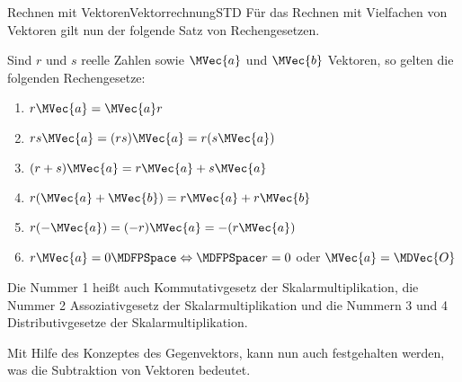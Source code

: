 \begin{MXContent}{Rechnen mit Vektoren}{Vektorrechnung}{STD}
Für das Rechnen mit Vielfachen von Vektoren gilt nun der folgende Satz von Rechengesetzen.

\begin{MInfo}
Sind $r$ und $s$ reelle Zahlen sowie $\MVec{a}$ und $\MVec{b}$ Vektoren, so gelten die folgenden Rechengesetze:
\begin{enumerate}
 \item $r\MVec{a}=\MVec{a}r$
 \item $r s\MVec{a}=(r s)\MVec{a}=r(s\MVec{a})$
 \item $(r+s)\MVec{a}=r\MVec{a}+s\MVec{a}$
 \item $r(\MVec{a}+\MVec{b})=r\MVec{a}+r\MVec{b}$
 \item $r(-\MVec{a})=(-r)\MVec{a}=-(r\MVec{a})$
 \item $r\MVec{a}=0\MDFPSpace\Leftrightarrow\MDFPSpace r=0$ oder $\MVec{a}=\MDVec{O}$
\end{enumerate}
Die Nummer 1 heißt auch Kommutativgesetz der Skalarmultiplikation, die Nummer 2 Assoziativgesetz der Skalarmultiplikation und die Nummern 3 und 4 Distributivgesetze der Skalarmultiplikation. 
\end{MInfo}


Mit Hilfe des Konzeptes des Gegenvektors, kann nun auch festgehalten werden, was die Subtraktion von Vektoren bedeutet.


\end{MXContent}
